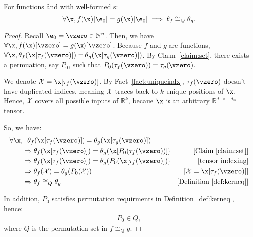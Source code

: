 


\begin{lemma}
For \simd{} functions \f and \g with well-formed \kfunc{}s:
\[
    \forall \x, f(\x)[\e_0]=g(\x)[\e_0] \implies \theta_f \cong_Q \theta_g.
\]
\label{lemma:kerneleq}
\end{lemma}

\begin{proof}
    Recall $\e_0 = \vzero \in \mathbb{N}^n$.
    Then, we have
    $\forall \x, f(\x)[\vzero] = g(\x)[\vzero]$.
    Because $f$ and $g$ are \simd{} functions,
    $\forall \x, \theta_f(\x[\tau_f(\vzero)]) = \theta_g(\x[\tau_g(\vzero)])$.
    By Claim~\ref{claim:set},
    there exists a permuation, say $P_0$,
    such that $P_0(\tau_f(\vzero)) = \tau_g(\vzero)$.

    We denote $\mathcal{X}=\x[\tau_f(\vzero)]$.
    By Fact~\ref{fact:uniqueindx}, $\tau_f(\vzero)$ doesn't have duplicated indices,
    meaning $\mathcal{X}$ traces back to $k$ unique positions of $\x$.
    Hence, $\mathcal{X}$ covers all possible inputs of $\mathbb{R}^k$,
    becaue $\x$ is an arbitrary $\mathbb{R}^{d_1\times\dots d_m}$ tensor.

    So, we have:
\begin{align*}
    \forall \x, &\ \ \theta_f(\x[\tau_f(\vzero)]) = \theta_g(\x[\tau_g(\vzero)]) \\
                &\Rightarrow \theta_f(\x[\tau_f(\vzero)]) = \theta_g(\x[P_0(\tau_f(\vzero))]) & \text{[Claim~\ref{claim:set}]}\\
                &\Rightarrow \theta_f(\x[\tau_f(\vzero)]) = \theta_g(P_0(\x[\tau_f(\vzero)])) &\text{[tensor indexing]}\\
                &\Rightarrow \theta_f(\mathcal{X}) = \theta_g(P_0(\mathcal{X})) &[\mathcal{X}=\x[\tau_f(\vzero)]] \\
                &\Rightarrow \theta_f \cong_Q \theta_g &[\text{Definition~\ref{def:kerneq}}]
\end{align*}

    In addition, $P_0$ satisfies permutation requirments in Definition~\ref{def:kerneq}, hence:
    \begin{align}
        P_0 \in Q,
        \label{eq:pinq}
    \end{align}
    where $Q$ is the permutation set in $f \cong_Q g$.
\end{proof}




